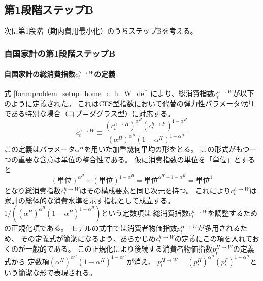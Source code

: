 
\subsection{第1段階ステップB}
\label{sec:chapter3_households_stage1b}
次に第1段階（期内費用最小化）のうちステップBを考える。

\subsubsection{自国家計の第1段階ステップB}
\label{sec:chapter3_households_stage1b_home}

\paragraph{自国家計の総消費指数\(c_t^{h\to W}\)の定義}
\label{sec:chapter3_households_stage1b_home_c_h_W_definition}
式
\eqref{form:problem_setup_home_c_h_W_def}
により、総消費指数\(c_t^{h\to W}\)が以下のように定義された。
これはCES型指数において代替の弾力性パラメータ\(\theta\)が1である特別な場合（コブ＝ダグラス型）に対応する。
\begin{equation}
\label{form:chapter3_households_stage1b_home_c_h_W_definition_def}
    c_t^{h\to W}\equiv\frac{(c_t^{h\to H})^{\alpha^H}(c_t^{h\to F})^{1-\alpha^H}}{(\alpha^H)^{\alpha^H}(1-\alpha^H)^{1-\alpha^H}}
\end{equation}
この定義はパラメータ\(\alpha^H\)を用いた加重幾何平均の形をとる。
この形式がもつ一つの重要な含意は単位の整合性である。
仮に消費指数の単位を「単位」とすると
\begin{equation}
\label{form:chapter3_households_stage1b_home_c_h_W_definition_unit_id}
    (\text{単位})^{\alpha^H}\times(\text{単位})^{1-\alpha^H}=\text{単位}^{\alpha^H+1-\alpha^H}=\text{単位}^1
\end{equation}
となり総消費指数\(c_t^{h\to W}\)はその構成要素と同じ次元を持つ。
これにより\(c_t^{h\to W}\)は家計の総体的な消費水準を示す指標として成立する。
\(1/\left((\alpha^H)^{\alpha^H}(1-\alpha^H)^{1-\alpha^H}\right)\)という定数項は
総消費指数\(c_t^{h\to W}\)を調整するための正規化項である。
モデルの式中では消費者物価指数\(p_t^{H\to W}\)が多用されるため、
その定義式が簡潔になるよう、あらかじめ\(c_t^{h\to W}\)の定義にこの項を入れておくのが一般的である。
この正規化により後続する消費者物価指数\(p_t^{H\to W}\)の定義式から
定数項\((\alpha^H)^{\alpha^H}(1-\alpha^H)^{1-\alpha^H}\)が消え、
\(p_t^{H\to W}=(p_t^H)^{\alpha^H}(p_t^F)^{1-\alpha^H}\)という簡潔な形で表現される。

